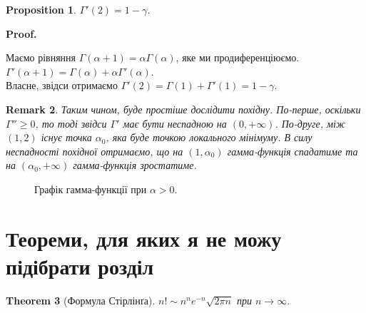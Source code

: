 \documentclass[a4paper, 10pt]{article}
\makeatletter
\def\qed{$\blacksquare$}
\theoremstyle{theoremdd}
\newtheorem{theorem}{Theorem}[subsection]
\theoremstyle{theoremdd}
\theoremstyle{theoremdd}
\theoremstyle{theoremdd}
\theoremstyle{theoremdd}
\theoremstyle{theoremdd}
\newtheorem{proposition}[theorem]{Proposition}
\theoremstyle{theoremdd}
\newtheorem{remark}[theorem]{Remark}
\theoremstyle{theoremdd}
\theoremstyle{theoremdd}
\renewenvironment{proof}[1][Proof.\\]{\par
\pushQED{\hfill \qed}%
\normalfont \topsep6\p@\@plus6\p@\relax
\trivlist
\item\relax
{\bfseries
#1\@addpunct{.}}\hspace\labelsep\ignorespaces
}{%
\popQED\endtrivlist\@endpefalse
}
\makeatother
\begin{document}
\begin{proposition}
$\Gamma'(2) = 1-\gamma$.
\end{proposition}

\begin{proof}
Маємо рівняння $\Gamma(\alpha+1) = \alpha \Gamma(\alpha)$, яке ми продиференціюємо.\\
$\Gamma'(\alpha+1) = \Gamma(\alpha) + \alpha \Gamma'(\alpha)$.\\
Власне, звідси отримаємо $\Gamma'(2) = \Gamma(1) + \Gamma'(1) = 1 - \gamma$.
\end{proof}

\begin{remark}
Таким чином, буде простіше дослідити похідну. По-перше, оскільки $\Gamma'' \geq 0$, то тоді звідси $\Gamma'$ має бути неспадною на $(0,+\infty)$. По-друге, між $(1,2)$ існує точка $\alpha_0$, яка буде точкою локального мінімуму. В силу неспадності похідної отримаємо, що на $(1,\alpha_0)$ гамма-функція спадатиме та на $(\alpha_0,+\infty)$ гамма-функція зростатиме.
\end{remark}

\begin{figure}[H]
\centering
{}
\caption*{Графік гамма-функції при $\alpha > 0$.}
\end{figure}
\fi

\newpage

\iffalse
\section*{Теореми, для яких я не можу підібрати розділ}
\begin{theorem}[Формула Стірлінґа]
$n! \sim n^n e^{-n} \sqrt{2\pi n}$ при $n \to \infty$.
\end{theorem}
\end{document}
